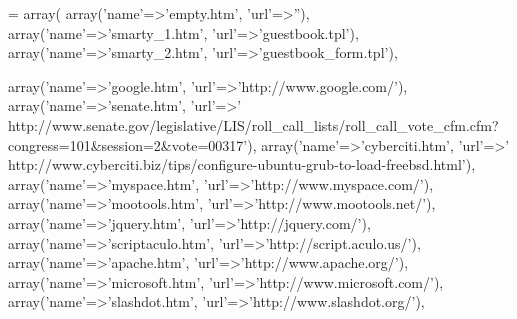 \begin{DoxyCode}
= array(
    array(\textcolor{stringliteral}{'name'}=>\textcolor{stringliteral}{'empty.htm'},          \textcolor{stringliteral}{'url'}=>\textcolor{stringliteral}{''}),
    array(\textcolor{stringliteral}{'name'}=>\textcolor{stringliteral}{'smarty\_1.htm'},       \textcolor{stringliteral}{'url'}=>\textcolor{stringliteral}{'guestbook.tpl'}),
    array(\textcolor{stringliteral}{'name'}=>\textcolor{stringliteral}{'smarty\_2.htm'},       \textcolor{stringliteral}{'url'}=>\textcolor{stringliteral}{'guestbook\_form.tpl'}),
    
    array(\textcolor{stringliteral}{'name'}=>\textcolor{stringliteral}{'google.htm'},         \textcolor{stringliteral}{'url'}=>\textcolor{stringliteral}{'http://www.google.com/'}),
    array(\textcolor{stringliteral}{'name'}=>\textcolor{stringliteral}{'senate.htm'},         \textcolor{stringliteral}{'url'}=>\textcolor{stringliteral}{'
      http://www.senate.gov/legislative/LIS/roll\_call\_lists/roll\_call\_vote\_cfm.cfm?congress=101&session=2&vote=00317'}),
    array(\textcolor{stringliteral}{'name'}=>\textcolor{stringliteral}{'cyberciti.htm'},      \textcolor{stringliteral}{'url'}=>\textcolor{stringliteral}{'
      http://www.cyberciti.biz/tips/configure-ubuntu-grub-to-load-freebsd.html'}),
    array(\textcolor{stringliteral}{'name'}=>\textcolor{stringliteral}{'myspace.htm'},        \textcolor{stringliteral}{'url'}=>\textcolor{stringliteral}{'http://www.myspace.com/'}),
    array(\textcolor{stringliteral}{'name'}=>\textcolor{stringliteral}{'mootools.htm'},       \textcolor{stringliteral}{'url'}=>\textcolor{stringliteral}{'http://www.mootools.net/'}),
    array(\textcolor{stringliteral}{'name'}=>\textcolor{stringliteral}{'jquery.htm'},         \textcolor{stringliteral}{'url'}=>\textcolor{stringliteral}{'http://jquery.com/'}),
    array(\textcolor{stringliteral}{'name'}=>\textcolor{stringliteral}{'scriptaculo.htm'},    \textcolor{stringliteral}{'url'}=>\textcolor{stringliteral}{'http://script.aculo.us/'}),
    array(\textcolor{stringliteral}{'name'}=>\textcolor{stringliteral}{'apache.htm'},         \textcolor{stringliteral}{'url'}=>\textcolor{stringliteral}{'http://www.apache.org/'}),
    array(\textcolor{stringliteral}{'name'}=>\textcolor{stringliteral}{'microsoft.htm'},      \textcolor{stringliteral}{'url'}=>\textcolor{stringliteral}{'http://www.microsoft.com/'}),
    array(\textcolor{stringliteral}{'name'}=>\textcolor{stringliteral}{'slashdot.htm'},       \textcolor{stringliteral}{'url'}=>\textcolor{stringliteral}{'http://www.slashdot.org/'}),

\end{DoxyCode}
